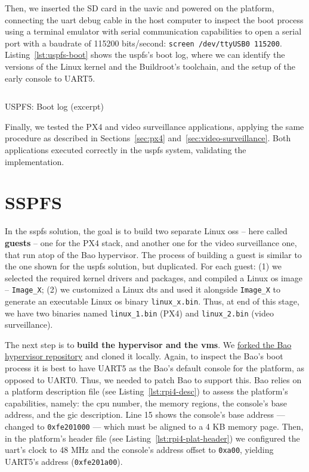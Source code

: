 Then, we inserted the SD card in the \gls{uavic} and powered on the platform,
connecting the \gls{uart} debug cable in the host computer to inspect the boot
process using a terminal emulator with serial communication capabilities to open
a serial port with a baudrate of 115200 bits/second: 
\lstinline{screen /dev/ttyUSB0 115200}. 
Listing~\ref{lst:uspfs-boot} shows the \gls{uspfs}'s boot log, where we can
identify the versions of
the Linux kernel and the Buildroot's toolchain, and the setup of the early
console to UART5. 

\begin{longlisting}
\centering
\inputminted[]{kconfig}{./listing/boot-uspfs.txt}
\caption{USPFS: Boot log (excerpt)}
\label{lst:uspfs-boot}
\end{longlisting}

Finally, we tested the PX4 and video surveillance
applications, applying the same procedure as described in Sections~\ref{sec:px4}
and~\ref{sec:video-surveillance}. Both applications executed correctly in the
\gls{uspfs} system, validating the implementation.

\section{SSPFS}
\label{sec:sspfs-implem}
In the \gls{sspfs} solution, the goal is to build two separate
Linux \glspl{os} -- here called \textbf{guests} -- one for the PX4 stack, and
another one for the video surveillance one, that run atop of the Bao
hypervisor. The process of building a guest is similar to the one shown for the
\gls{uspfs} solution, but duplicated. For each guest: (1) we selected the
required kernel drivers and packages, and compiled a Linux \gls{os} image --
\texttt{Image\_X}; (2) we customized a Linux \gls{dts} and used it alongside \texttt{Image\_X} to generate an executable Linux \gls{os}
binary \texttt{linux\_x.bin}. Thus, at end of this stage, we have two binaries
named \texttt{linux\_1.bin} (PX4) and \texttt{linux\_2.bin} (video surveillance). 

The next step is to \textbf{build the hypervisor and the \glspl{vm}}. We
\href{https://github.com/ElectroQuanta/bao-hypervisor-porting}{forked the Bao
  hypervisor repository} and cloned it locally. Again, to inspect the Bao's boot
process it is best to have UART5 as the Bao's default console
for the platform, as opposed to UART0. Thus, we needed to patch Bao to support
this. Bao relies on a platform description file (see Listing~\ref{lst:rpi4-desc}) to assess the platform's capabilities, namely:
the \gls{cpu} number, the memory regions, the console's base address, and the
\gls{gic} description. Line 15 shows the console's base address --- changed to
\lstinline{0xfe201000} --- which must be aligned to a 4 KB memory page. Then, in
the platform's header file (see Listing~\ref{lst:rpi4-plat-header}) we configured
the \gls{uart}'s clock to 48 MHz and the console's address offset to
\lstinline{0xa00}, yielding UART5's address (\lstinline{0xfe201a00}).


